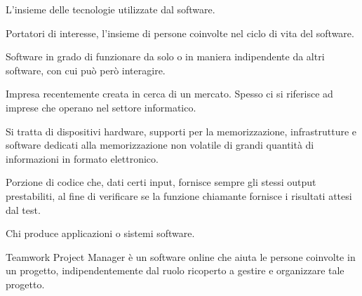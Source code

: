 \begin{itemize}
L'insieme delle tecnologie utilizzate dal software.


Portatori di interesse, l'insieme di persone coinvolte nel ciclo di vita del software.


Software in grado di funzionare da solo o in maniera indipendente da altri software, con cui può però interagire.


Impresa recentemente creata in cerca di un mercato. Spesso ci si riferisce ad imprese che operano nel settore informatico.


Si tratta di dispositivi hardware, supporti per la memorizzazione, infrastrutture e software dedicati alla memorizzazione non volatile di grandi quantità di informazioni in formato elettronico.


Porzione di codice che, dati certi input, fornisce sempre gli stessi output prestabiliti, al fine di verificare se la funzione chiamante fornisce i risultati attesi dal test.


Chi produce applicazioni o sistemi software.

\end{itemize}


\begin{itemize}


Teamwork Project Manager è un software online che aiuta le persone coinvolte in un progetto, indipendentemente dal ruolo ricoperto a gestire e organizzare tale progetto.


\end{itemize}


\begin{itemize}


\end{itemize}


\begin{itemize}


\end{itemize}


\begin{itemize}


\end{itemize}


%


